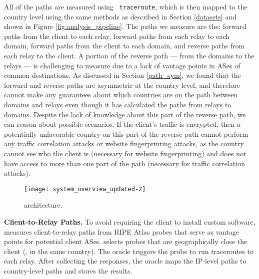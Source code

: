 All of the paths are measured using {\tt 
traceroute}, which is then mapped to the country level using the same methods as 
described in Section \ref{datasets} and shown in Figure 
\ref{fig:analysis_pipeline}.  The paths we measure are the: forward paths from 
the client to each relay, forward paths from each relay to each domain, forward 
paths from the client to each domain, and reverse paths from each relay to the 
client. 
A portion of the reverse path --- from the domains to the relays ---
is challenging to measure due to a lack of vantage points in ASes of
common destinations. As discussed in Section \ref{path_sym}, we found that 
the forward and reverse paths are asymmetric at the country level, and therefore 
\system{} cannot make any guarantees about which countries are on the path between 
domains and relays even though it has calculated the paths from relays to domains.  
Despite the lack of knowledge about this part of the reverse path, 
we can reason about possible scenarios.  If the client's traffic is encrypted, then a 
potentially unfavorable country on this part of the reverse path cannot perform any 
traffic correlation attacks or website fingerprinting attacks, as the country cannot see who
the client is (necessary for website fingerprinting) and does not have access to more than 
one part of the path (necessary for traffic correlation attacks).

\begin{figure}[t!]
    \centering
        \texttt{[image: system\_overview\_updated-2]}
        \caption{\system{} architecture.}
        \label{fig:arch}
\end{figure}


\textbf{Client-to-Relay Paths.} 
To avoid requiring the client to install custom software, \system{}
measures client-to-relay paths from RIPE Atlas probes that serve as 
vantage points for potential client ASes.  \system{} selects probes that
are geographically close the client (\eg, in the same 
country). The oracle triggers the probe to run traceroutes
to each relay.  After collecting the responses, the oracle maps 
the IP-level paths to country-level paths and stores the results.

